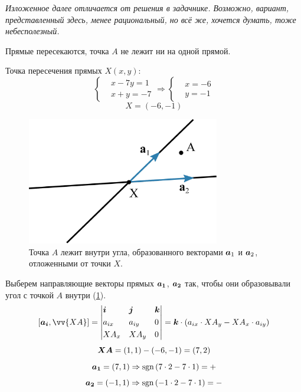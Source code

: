 \documentclass[a4paper,12pt]{article}
\begin{document}
  \begin{solution}
    \emph{Изложенное далее отличается от решения в задачнике.
    Возможно, вариант, представленный здесь, менее рациональный, но всё же, хочется думать, тоже небесполезный.}
    
    Прямые пересекаются, точка $A$ не лежит ни на одной прямой.
      
    Точка пересечения прямых $X(x, y)$:
    \[
      \left\{\begin{aligned}
        &x - 7y = 1\\
        &x + y = -7
      \end{aligned}\right.
      \Rightarrow
      \left\{\begin{aligned}
        &x = -6\\
        &y = -1
      \end{aligned}\right.
    \]
    \[
      \boxed{X = (-6, -1)}
    \]
    
    \begin{figure}[h]
      \centering
      
      \includegraphics[width=0.75\textwidth]{5-53}
      
      \caption{Точка $A$ лежит внутри угла, образованного векторами $\boldsymbol a_1$ и $\boldsymbol a_2$, отложенными от точки $X$.}
      \label{fig:5-53}
    \end{figure}

    Выберем направляющие векторы прямых $\boldsymbol{a_1}$, $\boldsymbol{a_2}$ так, чтобы они образовывали угол с точкой $A$ внутри (\ref{fig:5-53}).
    \[
      [\bds{a_i}, \vv{XA}] = \left|
        \begin{aligned}
          &\bds i & &\bds j & &\bds k\\
          &a_{ix} & &a_{iy} & &0\\
          &XA_x & &XA_y & &0
        \end{aligned}
      \right|
      = \bds k \cdot (a_{ix} \cdot XA_y - XA_x \cdot a_{iy})
    \]
    \[
      \boldsymbol{XA} = (1, 1) - (-6, -1) = (7, 2)
    \]
    \[
      \boldsymbol{a_1} = (7, 1) \Rightarrow \operatorname{sgn}{(7 \cdot 2 - 7 \cdot 1)} = +
    \]
    \[
      \boldsymbol{a_2} = (-1, 1) \Rightarrow \operatorname{sgn}{(-1 \cdot 2 - 7 \cdot 1)} = -
    \]
    

\end{solution}
\end{document}
